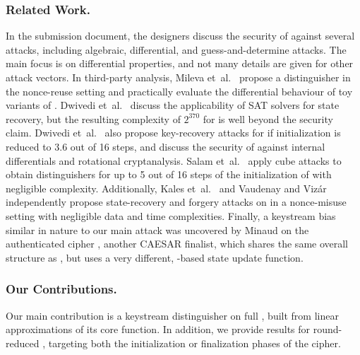 \subsubsection*{Related Work.}
In the \MORUS submission document, the designers discuss the security of \MORUS against
several attacks, including algebraic, differential, and guess-and-determine attacks.
The main focus is on differential properties, and not many details are given for other attack vectors.
In third-party analysis,
Mileva et~al.~\cite{balkancryptsecMilevaDV15} propose a distinguisher in the nonce-reuse setting and practically evaluate the differential behaviour of toy variants of \MORUS.
Dwivedi et~al.~\cite{cryptoeprint:2016:1053} discuss the applicability of SAT solvers for state recovery, but the resulting complexity of $2^{370}$ for \MORUS[640] is well beyond the security claim.
Dwivedi et~al.~\cite{secryptDwivediMW17} also propose key-recovery attacks for \MORUS[1280] if initialization is reduced to 3.6 out of 16 steps, and discuss the security of \MORUS against internal differentials and rotational cryptanalysis.
Salam et~al.~\cite{trustcomSalamSBDPW17} apply cube attacks to obtain distinguishers for up to 5 out of 16 steps of the initialization of \MORUS[1280] with negligible complexity.
Additionally, 
Kales et~al.~\cite{cryptoeprint:2017:1137} and
Vaudenay and Viz\'{a}r \cite{cryptoeprint:2017:1147}
independently propose state-recovery and forgery attacks on \MORUS in a nonce-misuse setting with negligible data and time complexities.
Finally, a keystream bias similar in nature to our main attack was uncovered by Minaud \cite{sacryptMinaud14} on the authenticated cipher  \cite{AEGIS,sacryptWuP13}, another CAESAR finalist, which shares the same overall structure as \MORUS, but uses a very different, -based state update function.

\subsubsection*{Our Contributions.}
Our main contribution is a keystream distinguisher on full \MORUS[1280], built from linear approximations of its core \StateUpdate{} function.
In addition, we provide results for round-reduced \MORUS, targeting both the initialization or finalization phases of the cipher.

